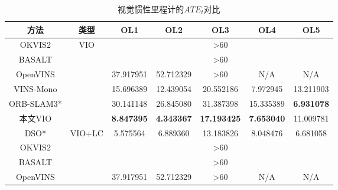 \begin{table}
\centering
\caption{视觉惯性里程计的$ATE_t$\textdownarrow{}对比}
\begin{tabular}{c|c|ccccc}
\toprule
方法 & 类型           & OL1 & OL2 & OL3 & OL4 & OL5 \\ \midrule
OKVIS2          & \multirow{6}{*}{VIO}    & \multicolumn{5}{c}{\textgreater{}60}                       \\
BASALT          &                         & \multicolumn{5}{c}{\textgreater{}60}                       \\
OpenVINS        &                         & 37.917951                                & 52.712329                                & {\textgreater{}60}                               & N/A                                      & N/A                                      \\
VINS-Mono       &                         & 15.696389                                & 12.439054                                &20.552186                                & 7.972945                                 & 13.211903                                \\
ORB-SLAM3*       &                         & 30.141148                                & 26.845080                                & 31.387398                                & 15.335389                                & \cellcolor[HTML]{FA7F6F}\textbf{6.931078}                                 \\
本文VIO            &                         & \cellcolor[HTML]{FA7F6F}\textbf{8.847395}                                 & \cellcolor[HTML]{FA7F6F}\textbf{4.343367}                                 &  \cellcolor[HTML]{FA7F6F}\textbf{17.193425}                                & \cellcolor[HTML]{FA7F6F}\textbf{7.653040}                                 & 11.009781                                \\ \midrule
DSO*         & \multirow{7}{*}{VIO+LC} & 5.575564                                 & 6.889360                                 & 13.183826                                & 8.048476                                 & 6.681058                                 \\
OKVIS2          &                         & \multicolumn{5}{c}{\textgreater{}60}                         \\
BASALT          &                         & \multicolumn{5}{c}{\textgreater{}60}                         \\
OpenVINS        &                         & 37.917951                                & 52.712329                                & {\textgreater{}60}                               & N/A                                      & N/A                                      \\

\end{tabular}
\end{table}
